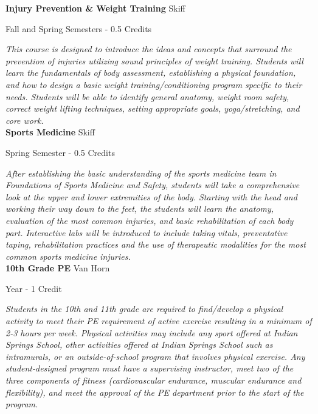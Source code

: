 \noindent\textbf{Injury Prevention \& Weight Training} \hfill Skiff

\noindent Fall and Spring Semesters - 0.5 Credits

\vspace{1mm}\emph{This course is designed to introduce the ideas and concepts that surround the prevention of injuries utilizing sound principles of weight training.  Students will learn the fundamentals of body assessment, establishing a physical foundation, and how to design a basic weight training/conditioning program specific to their needs.  Students will be able to identify general anatomy, weight room safety, correct weight lifting techniques, setting appropriate goals, yoga/stretching, and core work.}\\


\noindent\textbf{Sports Medicine} \hfill Skiff

\noindent Spring Semester - 0.5 Credits

\vspace{1mm}\emph{After establishing the basic understanding of the sports medicine team in Foundations of Sports Medicine and Safety, students will take a comprehensive look at the upper and lower extremities of the body.  Starting with the head and working their way down to the feet, the students will learn the anatomy, evaluation of the most common injuries, and basic rehabilitation of each body part.  Interactive labs will be introduced to include taking vitals, preventative taping, rehabilitation practices and the use of therapeutic modalities for the most common sports medicine injuries.}\\


\noindent\textbf{10th Grade PE} \hfill Van Horn

\noindent Year - 1 Credit

\vspace{1mm}\emph{Students in the 10th and 11th grade are required to find/develop a physical activity to meet their PE requirement of active exercise resulting in a minimum of 2-3 hours per week.  Physical activities may include any sport offered at Indian Springs School, other activities offered at Indian Springs School such as intramurals, or an outside-of-school program that involves physical exercise.  Any student-designed program must have a supervising instructor, meet two of the three components of fitness (cardiovascular endurance, muscular endurance and flexibility), and meet the approval of the PE department prior to the start of the program.}\\


